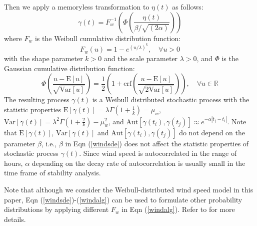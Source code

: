 \documentclass[journal]{IEEEtran}
\begin{document}
Then we apply a memoryless transformation to $\eta(t)$ as follows:
\begin{equation}\label{windalg}
\gamma(t)=F_w^{-1}(\Phi(\frac{\eta(t)}{\beta/\sqrt{(2\alpha)}}))
\end{equation}
where $F_w$ is the Weibull cumulative distribution function:
\begin{equation}
F_w(u)=1-e^{(u/\lambda)^k}, \quad \forall u>0
\end{equation}
with the shape parameter $k> 0$ and the scale parameter $\lambda>0$,
and $\Phi$ is the Gaussian cumulative distribution function:
\begin{equation}
\Phi(\frac{u-\mathrm{E}[u]}{\sqrt{\mathrm{Var}[u]}})=\frac{1}{2}(1+\mathrm{erf}(\frac{u-\mathrm{E}[u]}{\sqrt{2\mathrm{Var}[u]}})),\quad \forall u\in\mathbb{R}
\end{equation}
The resulting process $\gamma(t)$ is a Weibull distributed stochastic process with the statistic properties $ \mathrm{E}[\gamma(t)]=\lambda\Gamma(1+\frac{1}{k})=\mu_w$, $\mathrm{Var}[\gamma(t)]=\lambda^2 \Gamma(1+\frac{2}{k})-\mu_w^2$, and $\mathrm{Aut}[\gamma(t_i),\gamma(t_j)]\approx e^{-\alpha|t_j-t_i|}$. Note that $\mathrm{E}[\gamma(t)]$, $\mathrm{Var}[\gamma(t)]$ and $\mathrm{Aut}[\gamma(t_i),\gamma(t_j)]$ do not depend on the parameter $\beta$, i.e., $\beta$ in Eqn (\ref{windsde}) does not affect the statistic properties of stochastic process $\gamma(t)$\cite{Milano:2013_1}. Since wind speed is autocorrelated in the range of hours, $\alpha$ depending on the decay rate of autocorrelation is usually small in the time frame of stability analysis.

Note that although we consider the Weibull-distributed wind speed model in this paper, Eqn (\ref{windsde})-(\ref{windalg}) can be used to formulate other probability distributions by applying different $F_w$ in Eqn (\ref{windalg}). Refer to \cite{Milano:2013_1} for more details.
\end{document}
